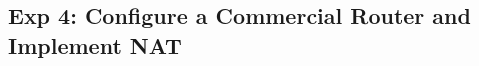 \documentclass[compilation.tex]{subfiles}
\begin{document}

\subsection{Exp 4: Configure a Commercial Router and Implement NAT}
\label{exp:4}
\end{document}
